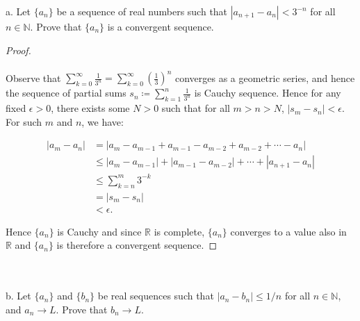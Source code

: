 a.  Let $\{a_n\}$ be a sequence of real numbers such that 
    $|a_{n+1} - a_n| < 3^{-n}$ for all $n \in \mathbb{N}$. Prove that $\{a_n\}$
    is a convergent sequence.  \\

    \begin{proof}\ \\\\
        Observe that $\sum\limits_{k=0}^{\infty}{\frac{1}{3^{n}}} = \sum\limits_{k=0}^{\infty}{\left(\frac{1}{3}\right)^n}$
        converges as a geometric series, and hence the sequence of partial sums 
        $s_n \coloneqq \sum\limits_{k=1}^{n}{\frac{1}{3^{n}}}$ is Cauchy
        sequence.  Hence for any fixed $\epsilon > 0$, there exists some $N > 0$
        such that for all $m > n > N$, $|s_m - s_n| < \epsilon$. For such $m$ 
        and $n$, we have:
    
        \begin{align*}
            |a_m - a_n| &= |a_m - a_{m-1} + a_{m-1} - a_{m-2} + a_{m-2} + \cdots - a_n | \\
                        &\le |a_m - a_{m-1}| + |a_{m-1} - a_{m-2}| + \cdots + |a_{n+1} - a_n | \\
                        &\le \sum\limits_{k=n}^m{3^{-k}} \\ 
                        &= |s_m - s_n| \\
                        &< \epsilon.
        \end{align*}
    
        Hence $\{a_n\}$ is Cauchy and since $\mathbb{R}$ is complete, $\{a_n\}$
        converges to a value also in $\mathbb{R}$ and $\{a_n\}$ is therefore a
        convergent sequence.
    \end{proof}
    \ \\\\

b.  Let $\{a_n\}$ and $\{b_n\}$ be real sequences such that
    $|a_n - b_n| \le 1/n$ for all $n \in \mathbb{N}$, and $a_n \rightarrow L$.
    Prove that $b_n \rightarrow L$. \\

